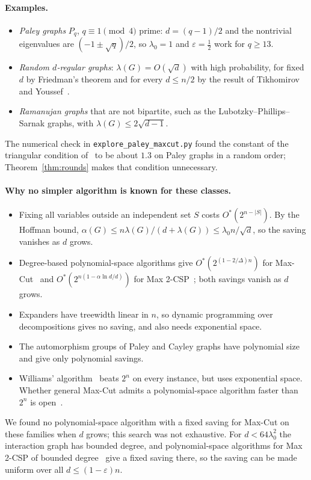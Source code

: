 \documentclass[11pt,a4paper]{article}
\theoremstyle{definition}
\theoremstyle{remark}
\newcommand{\Ostar}{O^{*}}
\begin{document}
\paragraph{Examples.}
\begin{itemize}
\item \emph{Paley graphs} $P_q$, $q\equiv1\pmod4$ prime: $d=(q-1)/2$ and the
nontrivial eigenvalues are $(-1\pm\sqrt q)/2$, so $\lambda_0=1$ and
$\varepsilon=\frac12$ work for $q\ge13$.
\item \emph{Random $d$-regular graphs}: $\lambda(G)=O(\sqrt d)$ with high
probability, for fixed $d$ by Friedman's theorem and for every
$d\le n/2$ by the result of Tikhomirov and Youssef~\cite{TY19}.
\item \emph{Ramanujan graphs} that are not bipartite, such as the
Lubotzky--Phillips--Sarnak graphs, with $\lambda(G)\le2\sqrt{d-1}$.
\end{itemize}
The numerical check in \texttt{explore\_paley\_maxcut.py} found the constant of
the triangular condition of~\cite{CG} to be about $1.3$ on Paley graphs in a
random order; Theorem~\ref{thm:rounds} makes that condition unnecessary.

\paragraph{Why no simpler algorithm is known for these classes.}
\begin{itemize}
\item Fixing all variables outside an independent set $S$ costs
$\Ostar(2^{n-|S|})$. By the Hoffman bound,
$\alpha(G)\le n\lambda(G)/(d+\lambda(G))\le\lambda_0n/\sqrt d$, so the saving
vanishes as $d$ grows.
\item Degree-based polynomial-space algorithms give
$\Ostar(2^{(1-2/\Delta)n})$ for Max-Cut~\cite{DKP07} and
$\Ostar(2^{n(1-\alpha\ln d/d)})$ for Max 2-CSP~\cite{GK}; both savings vanish as
$d$ grows.
\item Expanders have treewidth linear in $n$, so dynamic programming over
decompositions gives no saving, and also needs exponential space.
\item The automorphism groups of Paley and Cayley graphs have polynomial size and
give only polynomial savings.
\item Williams' algorithm~\cite{Williams} beats $2^n$ on every instance, but uses
exponential space. Whether general Max-Cut admits a polynomial-space algorithm
faster than $2^n$ is open~\cite{Lalovic24}.
\end{itemize}
We found no polynomial-space algorithm with a fixed saving for Max-Cut on these
families when $d$ grows; this search was not exhaustive. For $d<64\lambda_0^2$
the interaction graph has bounded degree, and polynomial-space algorithms for
Max 2-CSP of bounded degree~\cite{GK} give a fixed saving there, so the saving
can be made uniform over all $d\le(1-\varepsilon)n$.
\end{document}
